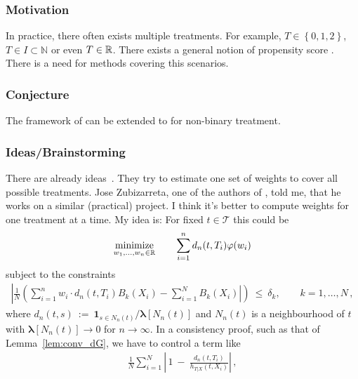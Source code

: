 \subsubsection{Motivation}
In practice, there often exists multiple treatments.
For example, $T\in \left\{
  0,1,2
\right\}$, $T\in I\subset \mathbb{N}$ or even $T\in\mathbb{R}$. 
There exists a general notion of propensity score \cite{Hirano2005}.
There is a need for methods covering this scenarios.
\subsubsection{Conjecture}
The framework of \cite{Wang2019} can be extended to for non-binary treatment.
\subsubsection{Ideas/Brainstorming}
There are already ideas~\cite{Tubbicke2020,Vegetabile2020}. They try to estimate one set of weights to cover all possible treatments.
Jose Zubizarreta, one of the authors of \cite{Wang2019}, told me, that he works on a similar (practical) project.
I think it's better to compute weights for one treatment at a time.
My idea is:
For fixed 
  $ t\in \mathcal{T} $
  this could be
  \begin{gather*}
    \underset{w_1, \ldots, w_n \in \mathbb{R}}{\mathrm{minimize}}
    \qquad
    \sum_{i = 1}^{n}
    d_n(t,T_i)
    \varphi(w_i)
  \end{gather*}
subject to the constraints
\begin{gather*}
    \left| 
      \frac{1}{N} 
      \left(
      \sum_{i = 1}^{n} 
      w_i  
      \cdot
    d_n(t,T_i)
      B_k(X_i)
      - 
      \sum_{i=1}^{N}
      B_k(X_i)
    \right|
      \right)
    \ 
    \le 
    \ 
    \delta_k,
    \qquad
    k = 1, \ldots, N
    \,,
\end{gather*}
where
$
  d_n(t,s)
  \ 
  :=
  \ 
  \mathbf{1} _ 
  { s \in N_n(t) }
  /
  \mathbf{\lambda}[N_n(t)]
$
and $ N_n(t) $ is a neighbourhood of $t$ with 
$  
  \mathbf{\lambda}[N_n(t)]
  \to
  0
  $
  for $ n \to \infty $.
  In a consistency proof, such as that of Lemma~\ref{lem:conv_dG},
  we have to control a term like
\begin{align*}
     \frac{1}{N}
     \sum_{i=1}^{N} 
     \left| 
     \,
      1
     \ 
      -
     \ 
     \frac
     {
     d_n(t,T_i)
     }
     {
        h_{T|X}(t,X_i)
     }
     \right|
     \,,
 \end{align*}
